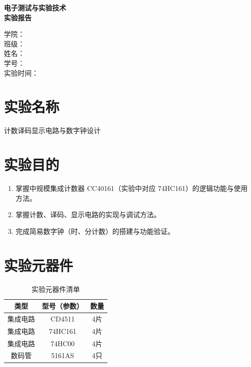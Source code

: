 \documentclass[a4paper,12pt]{article}
\begin{document}
\begin{titlepage}
    \centering
    \vfill
    {\bfseries 电子测试与实验技术\\[0.6em]实验报告\par}
    \vfill
    \vfill

    \begin{minipage}{0.72\textwidth}
        学\quad\quad 院：\underline{}\\[1.6em]
        班\quad\quad 级：\underline{}\\[1.6em]
        姓\quad\quad 名：\underline{}\\[1.6em]
        学\quad\quad 号：\underline{}\\[1.6em]
        实验时间：\underline{}
    \end{minipage}

    \vfill
    \vfill
\end{titlepage}

\setcounter{page}{1}

\section{实验名称}
计数译码显示电路与数字钟设计

\section{实验目的}
\begin{enumerate}
    \item 掌握中规模集成计数器 CC40161（实验中对应 74HC161）的逻辑功能与使用方法。
    \item 掌握计数、译码、显示电路的实现与调试方法。
    \item 完成简易数字钟（时、分计数）的搭建与功能验证。
\end{enumerate}

\section{实验元器件}
\begin{table}[H]
\centering
\caption{实验元器件清单}
\begin{tabular}{|c|c|c|}
\hline
类型 & 型号（参数） & 数量 \\
\hline
集成电路 & CD4511 & 4片 \\
\hline
集成电路 & 74HC161 & 4片 \\
\hline
集成电路 & 74HC00 & 4片 \\
\hline
数码管 & 5161AS & 4只 \\
\hline
\end{tabular}
\end{table}
\end{document}
